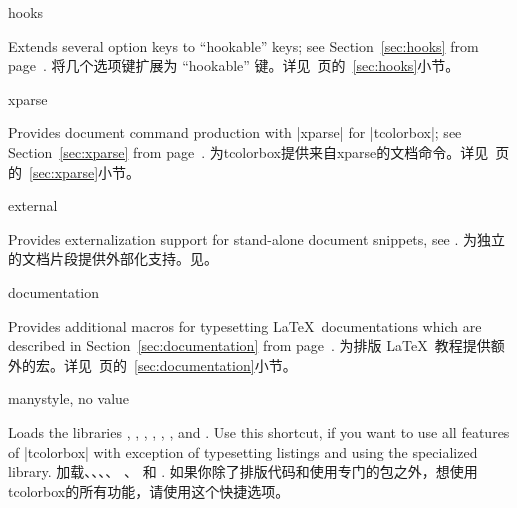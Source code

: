 \begin{docTcbKey}[library]{hooks}{}{}
\begin{stripedbox}
Extends several option keys to \enquote{hookable} keys;
see Section~\ref{sec:hooks} from page~\pageref{sec:hooks}.
\tcblower
将几个选项键扩展为 \enquote{hookable} 键。详见~\pageref{sec:hooks}页的~\ref{sec:hooks}小节。
\end{stripedbox}
\end{docTcbKey}

\begin{docTcbKey}[library]{xparse}{}{}
\begin{stripedbox}
Provides document command production with |xparse| for |tcolorbox|;
see Section~\ref{sec:xparse} from page~\pageref{sec:xparse}.
\tcblower
为tcolorbox提供来自xparse的文档命令。详见~\pageref{sec:xparse}页的~\ref{sec:xparse}小节。
\end{stripedbox}
\end{docTcbKey}

\begin{docTcbKey}[library]{external}{}{}
\begin{stripedbox}
Provides externalization support for stand-alone document snippets,
see .
\tcblower
为独立的文档片段提供外部化支持。见。
\end{stripedbox}
\end{docTcbKey}

\begin{docTcbKey}[library]{documentation}{}{}
\begin{stripedbox}
Provides additional macros for typesetting \LaTeX\ documentations
which are described in Section~\ref{sec:documentation}
from page~\pageref{sec:documentation}. 
\tcblower
为排版 \LaTeX\ 教程提供额外的宏。详见~\pageref{sec:documentation}页的~\ref{sec:documentation}小节。
\end{stripedbox}
\end{docTcbKey}

\begin{docTcbKey}[library]{many}{}{style, no value}
\begin{stripedbox}
Loads the libraries , , , ,
, , and .
Use this shortcut, if you want to use all features of |tcolorbox|
with exception of typesetting listings and using
the specialized  library.
\tcblower
加载、、、、%
、 和 .%
如果你除了排版代码和使用专门的包之外，想使用tcolorbox的所有功能，请使用这个快捷选项。
\end{stripedbox}
\end{docTcbKey}

